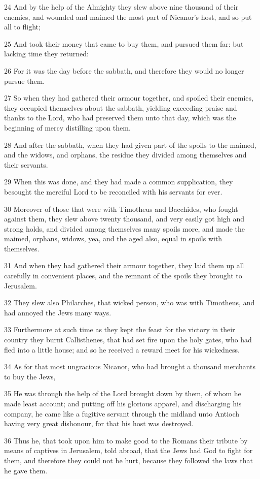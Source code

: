 \par 24 And by the help of the Almighty they slew above nine thousand of their enemies, and wounded and maimed the most part of Nicanor's host, and so put all to flight;
\par 25 And took their money that came to buy them, and pursued them far: but lacking time they returned:
\par 26 For it was the day before the sabbath, and therefore they would no longer pursue them.
\par 27 So when they had gathered their armour together, and spoiled their enemies, they occupied themselves about the sabbath, yielding exceeding praise and thanks to the Lord, who had preserved them unto that day, which was the beginning of mercy distilling upon them.
\par 28 And after the sabbath, when they had given part of the spoils to the maimed, and the widows, and orphans, the residue they divided among themselves and their servants.
\par 29 When this was done, and they had made a common supplication, they besought the merciful Lord to be reconciled with his servants for ever.
\par 30 Moreover of those that were with Timotheus and Bacchides, who fought against them, they slew above twenty thousand, and very easily got high and strong holds, and divided among themselves many spoils more, and made the maimed, orphans, widows, yea, and the aged also, equal in spoils with themselves.
\par 31 And when they had gathered their armour together, they laid them up all carefully in convenient places, and the remnant of the spoils they brought to Jerusalem.
\par 32 They slew also Philarches, that wicked person, who was with Timotheus, and had annoyed the Jews many ways.
\par 33 Furthermore at such time as they kept the feast for the victory in their country they burnt Callisthenes, that had set fire upon the holy gates, who had fled into a little house; and so he received a reward meet for his wickedness.
\par 34 As for that most ungracious Nicanor, who had brought a thousand merchants to buy the Jews,
\par 35 He was through the help of the Lord brought down by them, of whom he made least account; and putting off his glorious apparel, and discharging his company, he came like a fugitive servant through the midland unto Antioch having very great dishonour, for that his host was destroyed.
\par 36 Thus he, that took upon him to make good to the Romans their tribute by means of captives in Jerusalem, told abroad, that the Jews had God to fight for them, and therefore they could not be hurt, because they followed the laws that he gave them.

